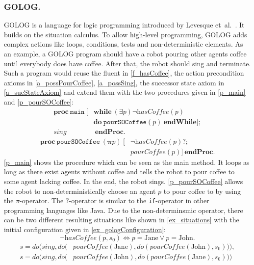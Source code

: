\subsubsection{GOLOG.}\label{fun:apl_golog}
GOLOG is a language for logic programming introduced by Levesque et~al.~\cite{levesque_golog:_1997}. It builds on the situation calculus. To allow high-level programming, GOLOG adds complex actions like loops, conditions, tests and non-deterministic elements. As an example, a GOLOG program should have a robot pouring other agents coffee until everybody does have coffee. After that, the robot should sing and terminate. Such a program would reuse the fluent in \autoref{f_hasCoffee}, the action precondition axioms in \autoref{a_possPourCoffee}, \autoref{a_possSing}, the successor state axiom in \autoref{a_sucStateAxiom} and extend them with the two procedures given in \autoref{p_main} and \autoref{p_pourSOCoffee}:
\begin{equation}\label{p_main}
  \begin{split}
    \textbf{proc}\ \texttt{main}\ [&\textbf{while}\ (\exists p) \neg\textit{hasCoffee}(p) \\
    &\textbf{do}\ \texttt{pourSOCoffee}(p)\ \textbf{endWhile}]; \\
    \textit{sing}&\ \textbf{endProc}.
  \end{split}
\end{equation}
\begin{equation}\label{p_pourSOCoffee}
  \begin{split}
    \textbf{proc}\ \texttt{pourSOCoffee}\ (\boldsymbol{\pi} p)\ [ &\neg\textit{hasCoffee}(p)\textbf{?}; \\
    &\textit{pourCoffee}(p)]\ \textbf{endProc}.
  \end{split}
\end{equation}
\autoref{p_main} shows the procedure which can be seen as the main method. It loops as long as there exist agents without coffee and tells the robot to pour coffee to some agent lacking coffee. In the end, the robot sings. \autoref{p_pourSOCoffee} allows the robot to non-deterministically choose an agent $p$ to pour coffee to by using the $\pi$-operator. The $?$-operator is similar to the \texttt{if}-operator in other programming languages like Java. Due to the non-determinsmic operator, there can be two different resulting situations like shown in \autoref{ex_situations} with the initial configuration given in \autoref{ex_gologConfiguration}:
\begin{equation}\label{ex_gologConfiguration}
  \neg\textit{hasCoffee}(p,s_0) \Leftrightarrow p=\textrm{Jane} \vee p=\textrm{John}.
\end{equation}
\begin{equation}\label{ex_situations}
  \begin{split}
    s=\textit{do}\Big(\textit{sing},\textit{do}\big(&\textit{pourCoffee}(\textrm{Jane}),
      \textit{do}(\textit{pourCoffee}(\textrm{John}),s_0)\big)\Big),
\\  s=\textit{do}\Big(\textit{sing},\textit{do}\big(&\textit{pourCoffee}(\textrm{John}),
      \textit{do}(\textit{pourCoffee}(\textrm{Jane}),s_0)\big)\Big)
  \end{split}
\end{equation}

